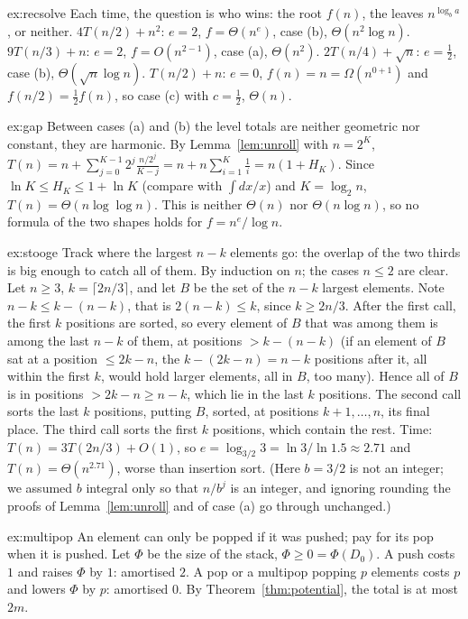 \begin{solution}{ex:recsolve}
\idea Each time, the question is who wins: the root $f(n)$, the leaves $n^{\log_ba}$, or neither.
\writeup $4T(n/2)+n^2$: $e=2$, $f=\Theta(n^e)$, case (b), $\Theta(n^2\log n)$. $9T(n/3)+n$: $e=2$, $f=O(n^{2-1})$, case (a), $\Theta(n^2)$.
$2T(n/4)+\sqrt n$: $e=\frac12$, case (b), $\Theta(\sqrt n\log n)$. $T(n/2)+n$: $e=0$, $f(n)=n=\Omega(n^{0+1})$ and $f(n/2)=\frac12f(n)$, so case (c) with
$c=\frac12$, $\Theta(n)$.
\end{solution}

\begin{solution}{ex:gap}
\idea Between cases (a) and (b) the level totals are neither geometric nor constant, they are harmonic.
\writeup By Lemma~\ref{lem:unroll} with $n=2^K$, $T(n)=n+\sum_{j=0}^{K-1}2^j\frac{n/2^j}{K-j}=n+n\sum_{i=1}^K\frac1i=n(1+H_K)$. Since $\ln K\le H_K\le1+\ln K$ (compare with
$\int dx/x$) and $K=\log_2n$, $T(n)=\Theta(n\log\log n)$. This is neither $\Theta(n)$ nor $\Theta(n\log n)$, so no formula of the two shapes holds
for $f=n^e/\log n$.
\end{solution}

\begin{solution}{ex:stooge}
\idea Track where the largest $n-k$ elements go: the overlap of the two thirds is big enough to catch all of them.
\writeup By induction on $n$; the cases $n\le2$ are clear. Let $n\ge3$, $k=\lceil2n/3\rceil$, and let $B$ be the set of the $n-k$ largest elements.
Note $n-k\le k-(n-k)$, that is $2(n-k)\le k$, since $k\ge2n/3$. After the first call, the first $k$ positions are sorted, so every element of $B$
that was among them is among the last $n-k$ of them, at positions $>k-(n-k)$ (if an element of $B$ sat at a position $\le 2k-n$, the $k-(2k-n)=n-k$
positions after it, all within the first $k$, would hold larger elements, all in $B$, too many). Hence all of $B$ is in positions $>2k-n\ge n-k$,
which lie in the last $k$ positions. The second call sorts the last $k$ positions, putting $B$, sorted, at positions $k+1,\dots,n$, its final place.
The third call sorts the first $k$ positions, which contain the rest. Time: $T(n)=3T(2n/3)+O(1)$, so $e=\log_{3/2}3=\ln3/\ln1.5\approx2.71$ and
$T(n)=\Theta(n^{2.71})$, worse than insertion sort. (Here $b=3/2$ is not an integer; we assumed $b$ integral only so that $n/b^j$ is an integer, and ignoring rounding the proofs of
Lemma~\ref{lem:unroll} and of case (a) go through unchanged.)
\end{solution}

\begin{solution}{ex:multipop}
\idea An element can only be popped if it was pushed; pay for its pop when it is pushed.
\writeup Let $\Phi$ be the size of the stack, $\Phi\ge0=\Phi(D_0)$. A push costs $1$ and raises $\Phi$ by $1$: amortised $2$. A pop or a multipop
popping $p$ elements costs $p$ and lowers $\Phi$ by $p$: amortised $0$. By Theorem~\ref{thm:potential}, the total is at most $2m$.
\end{solution}

